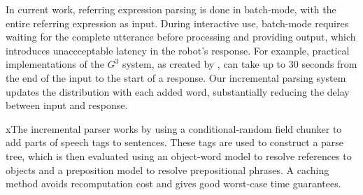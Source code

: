 \documentclass[conference]{IEEEtran}
\numberwithin{equation}{section}
\begin{document}
In current work, referring expression parsing is done in batch-mode, with the entire referring expression as input. \citep{tellex2011understanding,UW_RSE_ICML2012,artzi2013weakly,fang2015embodied} During interactive use, batch-mode requires waiting for the complete utterance before processing and providing output, which introduces unaccceptable latency in the robot's response. For example, practical implementations of the $G^3$ system, as created by \citet{tellex2011understanding}, can take up to 30 seconds from the end of the input to the start of a response. Our incremental parsing system updates the distribution with each added word, substantially reducing the delay between input and response.

xThe incremental parser works by using a conditional-random field chunker to add parts of speech tags to sentences. These tags are used to construct a parse tree, which is then evaluated using an object-word model to resolve references to objects and a preposition model to resolve prepositional phrases. A caching method avoids recomputation cost and gives good worst-case time guarantees.

\end{document}
